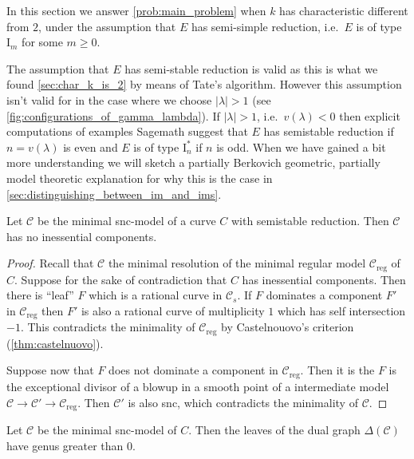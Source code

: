 In this section we answer \cref{prob:main_problem} when $k$ has characteristic different from $2$, under the assumption that $E$ has semi-simple reduction, i.e.\  $E$ is of type $\mathrm I_m$ for some $m \ge 0$. 

\begin{remark}\label{rem:justification_semistable}
	The assumption that $E$ has semi-stable reduction is valid as this is what we found \cref{sec:char_k_is_2} by means of Tate's algorithm. 
	However this assumption isn't valid for in the case where we choose $|\lambda| > 1$ (see \cref{fig:configurations_of_gamma_lambda}).
	If $|\lambda| > 1$, i.e.\ $v(\lambda) < 0$ then
	explicit computations of examples Sagemath suggest that  $E$ has semistable reduction if $n = v(\lambda)$ is even and $E$ is of type $\mathrm I^*_n$ if $n$ is odd. 
	When we have gained a bit more understanding we will sketch a partially Berkovich geometric, partially model theoretic explanation for why this is the case in \cref{sec:distinguishing_between_im_and_ims}. 
\end{remark}

\begin{lemma}\label{lem:semistable_skeleton}
	Let $\mathscr C$ be the minimal snc-model of a curve $C$ with semistable reduction.
	Then $\mathscr C$ has no inessential components. 
\end{lemma}
\begin{proof}
	Recall that $\mathscr C$ the minimal resolution of the minimal regular model $\mathscr C_\text{reg} $ of $C$. 
	Suppose for the sake of contradiction that  $C$ has inessential components.
	Then there is ``leaf''  $F$ which is a rational curve in $\mathscr C_s$. 
	If $F$ dominates a component $F'$ in $\mathscr C_\text{reg} $ then $F'$ is also a rational curve of multiplicity $1$ which has self intersection $-1$.
	This contradicts the minimality of  $\mathscr C _\text{reg} $ by Castelnouovo's criterion (\cref{thm:castelnuovo}). 

	Suppose now that $F$ does not dominate a component in $\mathscr C_\text{reg} $.
	Then it is the $F$ is the exceptional divisor of a blowup in a smooth point of a intermediate model $\mathscr C \to \mathscr C' \to \mathscr C_\text{reg} $. 
	Then $\mathscr C'$ is also snc, which contradicts the minimality of $\mathscr C$. 
\end{proof}
\begin{corollary}
	Let $\mathscr C$ be the minimal snc-model of $C$. 
	Then the leaves of the dual graph  $\Delta (\mathscr C)$ have genus greater than $0$. 
\end{corollary}

